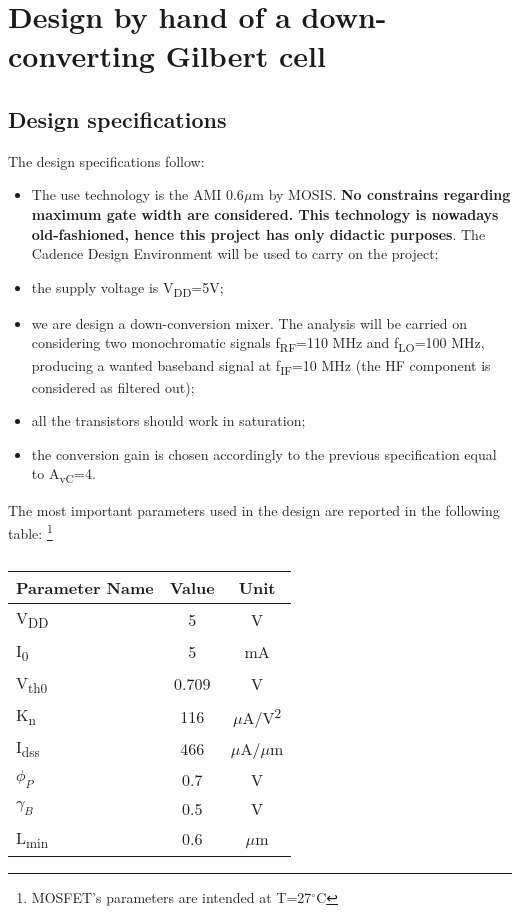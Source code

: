 \section{Design by hand of a down-converting Gilbert cell}

\subsection{Design specifications}
The design specifications follow:
\begin{itemize}
	\item The use technology is the AMI 0.6$\mu$m by MOSIS. \textbf{No constrains regarding maximum gate width are considered. This technology is nowadays  old-fashioned, hence this project has only didactic purposes}. The Cadence Design Environment will be used to carry on the project;
	\item the supply voltage is V\textsubscript{DD}=5V;
	\item we are design a down-conversion mixer. The analysis will be carried on considering two monochromatic signals f\textsubscript{RF}=110 MHz and f\textsubscript{LO}=100 MHz, producing a wanted baseband signal at f\textsubscript{IF}=10 MHz (the HF component is considered as filtered out);
	\item all the transistors should work in saturation;
	\item the conversion gain is chosen accordingly to the previous specification equal to A\textsubscript{vC}=4.
\end{itemize}
The most important parameters used in the design are reported in the following table: \footnote{MOSFET's parameters are intended at T=27$^\circ$C}
\begin{table} [h]
	\label{tab:specs}
	\caption{}
	\centering	
	\begin{tabular}{lcc} 
		\toprule 
		Parameter Name			& Value 	& Unit \\ 
		\midrule
		V\textsubscript{DD}		&	5 & V		\\
		I\textsubscript{0} & 5 & mA \\
		V\textsubscript{th0}			& 0.709 &V		\\ 
		K\textsubscript{n} & 116 & $\mu$A/V\textsuperscript{2}\\
		I\textsubscript{dss}	& 466 & $\mu$A/$\mu$m \\
		$\phi_P$ & 0.7 & V \\
		$\gamma_B$ & 0.5 & V \\
		L\textsubscript{min} & 0.6 & $\mu$m \\
		\bottomrule 
	\end{tabular}	
\end{table}

